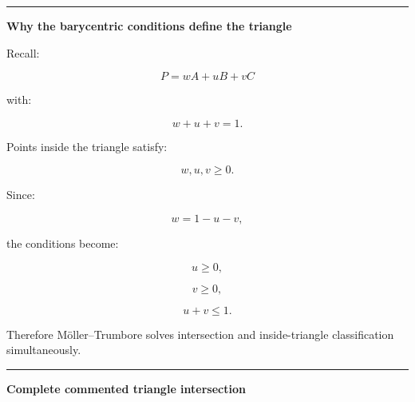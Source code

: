 \begin{center}\rule{0.5\linewidth}{0.5pt}\end{center}

\textbf{Why the barycentric conditions define the triangle}

Recall:

\[
P=
wA+uB+vC
\]

with:

\[
w+u+v=1.
\]

Points inside the triangle satisfy:

\[
w,u,v\ge0.
\]

Since:

\[
w=1-u-v,
\]

the conditions become:

\[
u\ge0,
\]

\[
v\ge0,
\]

\[
u+v\le1.
\]

Therefore Möller--Trumbore solves intersection and inside-triangle classification simultaneously.

\begin{center}\rule{0.5\linewidth}{0.5pt}\end{center}

\textbf{Complete commented triangle intersection}

